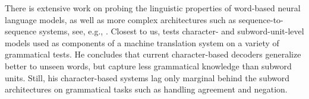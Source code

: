 There is extensive work on probing the linguistic properties of
word-based neural language models, as well as more complex
architectures such as sequence-to-sequence systems, see, e.g.,
. Closest
to us,  tests character- and subword-unit-level
models used as components of a machine translation system on a variety
of grammatical tests. He concludes that current character-based
decoders generalize better to unseen words, but capture less
grammatical knowledge than subword units. Still, his character-based
systems lag only marginal behind the subword architectures on
grammatical tasks such as handling agreement and negation.






